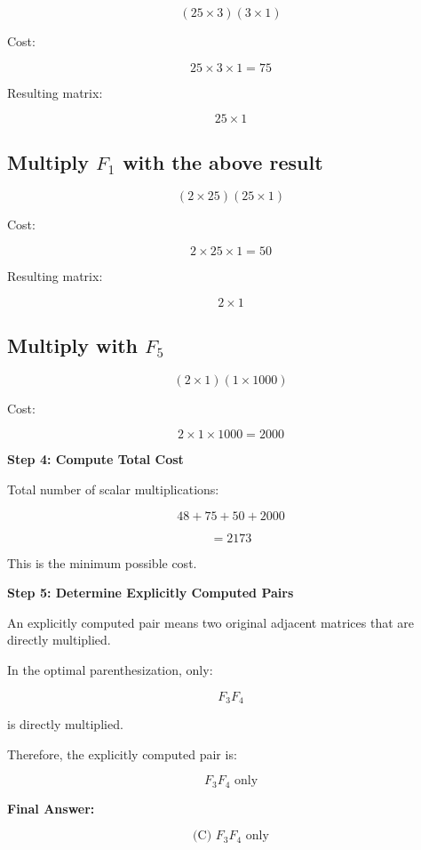 \documentclass[12pt]{article}
\begin{document}
\[
(25 \times 3)(3 \times 1)
\]

Cost:

\[
25 \times 3 \times 1 = 75
\]

Resulting matrix:

\[
25 \times 1
\]

\vspace{0.3cm}

\subsection*{Multiply $F_1$ with the above result}

\[
(2 \times 25)(25 \times 1)
\]

Cost:

\[
2 \times 25 \times 1 = 50
\]

Resulting matrix:

\[
2 \times 1
\]

\vspace{0.3cm}

\subsection*{Multiply with $F_5$}

\[
(2 \times 1)(1 \times 1000)
\]

Cost:

\[
2 \times 1 \times 1000 = 2000
\]

\vspace{0.5cm}

\textbf{Step 4: Compute Total Cost}

Total number of scalar multiplications:

\[
48 + 75 + 50 + 2000
\]

\[
= 2173
\]

This is the minimum possible cost.

\vspace{0.5cm}

\textbf{Step 5: Determine Explicitly Computed Pairs}

An explicitly computed pair means two original adjacent matrices that are directly multiplied.

In the optimal parenthesization, only:

\[
F_3F_4
\]

is directly multiplied.

Therefore, the explicitly computed pair is:

\[
\boxed{F_3F_4 \text{ only}}
\]

\vspace{0.5cm}

\textbf{Final Answer:}

\[
\boxed{\text{(C) } F_3F_4 \text{ only}}
\]
\end{document}

